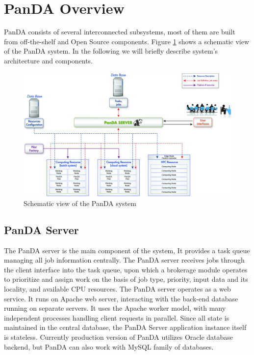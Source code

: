 \documentclass[10pt, conference, compsocconf]{IEEEtran}
\begin{document}
\section{PanDA Overview}\label{sec:panda_overview}
PanDA consists of several interconnected subsystems, most of them are built from off-the-shelf and Open Source components. Figure \ref{fig:architecture} shows a schematic view of the PanDA system.
In the following we will briefly describe system’s architecture and components.

\begin{figure}
\begin{center}
\includegraphics[width=\columnwidth]{figures/PandaArch.jpg}
\caption{Schematic view of the PanDA system\label{fig:architecture}}
\end{center}
\end{figure}
\subsection{PanDA Server}
The PanDA server is the main component of the system, It provides  a task queue managing all job information centrally. The PanDA  server receives jobs through the client interface into the task queue, upon which a brokerage module  operates to prioritize  and assign work on the basis of job type, priority, input data and its locality, and available CPU resources. The PanDA  server operates as a web service. It runs on Apache web server, interacting with the back-end database running  on separate servers. It uses the Apache worker  model, with many independent   processes  handling client requests  in  parallel. Since all  state is maintained  in  the central database,  the PanDA Server application instance itself is stateless. Currently production version of PanDA utilizes Oracle database backend, but PanDA  can also work with MySQL family of databases.
\end{document}
